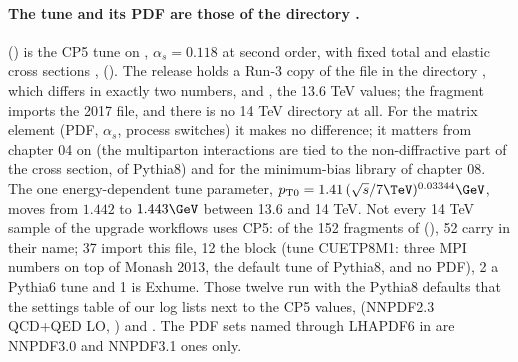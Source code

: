 \paragraph{The tune and its PDF are those of the directory .} 
() is the CP5 tune on ,
$\alpha_s = 0.118$ at second order, with fixed total and elastic cross sections
,  (). The release
holds a Run-3 copy of the file in the directory , which differs in exactly two
numbers,  and , the 13.6 TeV values; the fragment imports
the 2017 file, and there is no 14 TeV directory at all. For the matrix element (PDF, $\alpha_s$, process
switches) it makes no difference; it matters from chapter 04 on (the multiparton interactions are tied to the
non-diffractive part of the cross section,  of Pythia8) and for the
minimum-bias library of chapter 08. The one energy-dependent tune parameter,
$p_{\mathrm T0} = 1.41\,(\sqrt s/7\TeV)^{0.03344}\GeV$, moves from $1.442$ to $1.443\GeV$ between 13.6 and
14 TeV. Not every 14 TeV sample of the upgrade workflows uses CP5: of the 152 fragments of
 (), 52 carry  in their name; 37 import
this file, 12 the block  (tune CUETP8M1: three MPI numbers on top of
Monash 2013, the default tune of Pythia8, and no PDF), 2 a Pythia6 tune and 1 is Exhume. Those twelve run with the Pythia8 defaults that the
settings table of our log lists next to the CP5 values,  (NNPDF2.3 QCD+QED LO,
) and . The PDF sets named through LHAPDF6 in
 are NNPDF3.0 and NNPDF3.1 ones only.

